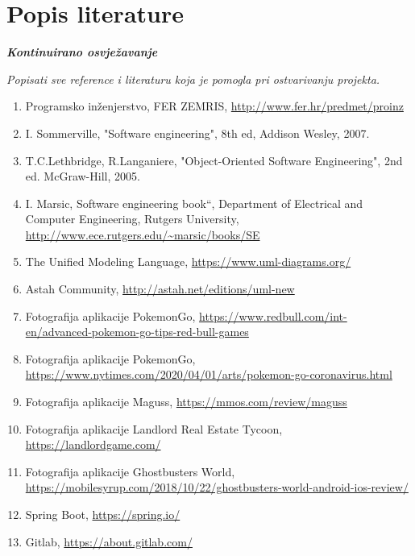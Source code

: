\chapter*{Popis literature}
	 	
 		\textbf{\textit{Kontinuirano osvježavanje}}
	
		\textit{Popisati sve reference i literaturu koja je pomogla pri ostvarivanju projekta.}
		
		
		\begin{enumerate}
			
			
			\item  Programsko inženjerstvo, FER ZEMRIS, \url{http://www.fer.hr/predmet/proinz}
			
			\item  I. Sommerville, "Software engineering", 8th ed, Addison Wesley, 2007.
			
			\item  T.C.Lethbridge, R.Langaniere, "Object-Oriented Software Engineering", 2nd ed. McGraw-Hill, 2005.
			
			\item  I. Marsic, Software engineering book``, Department of Electrical and Computer Engineering, Rutgers University, \url{http://www.ece.rutgers.edu/~marsic/books/SE}
			
			\item  The Unified Modeling Language, \url{https://www.uml-diagrams.org/}
			
			\item  Astah Community, \url{http://astah.net/editions/uml-new}
			
			\item Fotografija aplikacije PokemonGo, 
			\url {https://www.redbull.com/int-en/advanced-pokemon-go-tips-red-bull-games}
			
			\item Fotografija aplikacije PokemonGo, 
			\url {https://www.nytimes.com/2020/04/01/arts/pokemon-go-coronavirus.html}
			
			\item Fotografija aplikacije Maguss, 
			\url{https://mmos.com/review/maguss}
			
			\item Fotografija aplikacije Landlord Real Estate Tycoon,
			\url{https://landlordgame.com/}
			
			\item Fotografija aplikacije Ghostbusters World,
			\url{https://mobilesyrup.com/2018/10/22/ghostbusters-world-android-ios-review/}
			
			\item Spring Boot,
			\url{https://spring.io/}
			
			\item Gitlab,
			\url{https://about.gitlab.com/}
		\end{enumerate}
		
		 